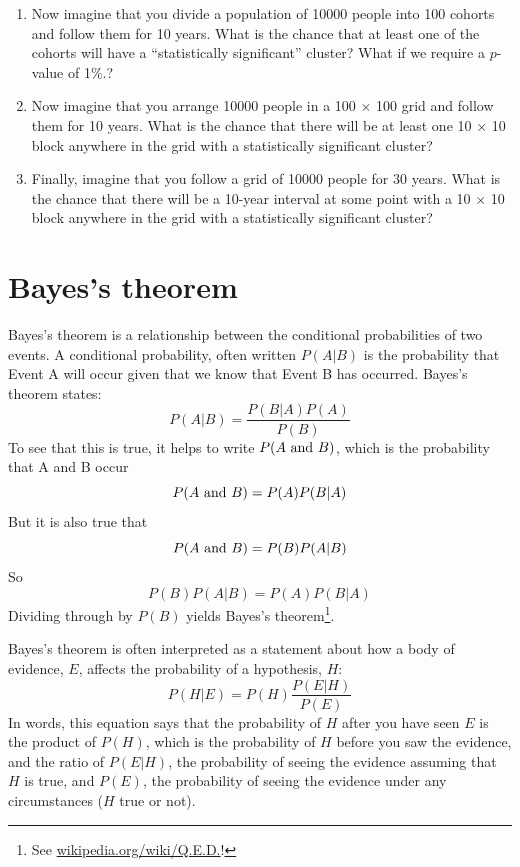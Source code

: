\documentclass[12pt]{book}
\begin{document}
\begin{exercise}
\begin{enumerate}
\item Now imagine that you divide a population of 10000 people into 100
  cohorts and follow them for 10 years.  What is the chance that at
  least one of the cohorts will have a ``statistically significant''
  cluster?  What if we require a $p$-value of 1\%.?

\item Now imagine that you arrange 10000 people in a 100 $\times$ 100
  grid and follow them for 10 years.  What is the chance that there
  will be at least one 10 $\times$ 10 block anywhere in the grid
  with a statistically significant cluster?

\item Finally, imagine that you follow a grid of 10000 people for 30
  years.  What is the chance that there will be a 10-year interval
  at some point with a 10 $\times$ 10 block anywhere in the grid
  with a statistically significant cluster?

\end{enumerate}

\end{exercise}



\section{Bayes's theorem}

Bayes's theorem is a relationship between the conditional probabilities
of two events.  A conditional probability, often written $P(A|B)$ is
the probability that Event A will occur given that we know that
Event B has occurred.  Bayes's theorem states:
%
\[ P(A|B) = \frac{P(B|A)P(A)}{P(B)} \]
%
To see that this is true, it helps to write $P(A ~\mbox{and}~ B)$, which
is the probability that A and B occur
%
\[ P(A ~\mbox{and}~ B) = P(A) P(B|A) \]
%
But it is also true that 
%
\[ P(A ~\mbox{and}~ B) = P(B) P(A|B) \]
%
So
%
\[ P(B) P(A|B) = P(A) P(B|A) \]
%
Dividing through by $P(B)$ yields Bayes's theorem\footnote{See
\url{wikipedia.org/wiki/Q.E.D.}!}.


Bayes's theorem is often interpreted as a statement about 
how a body of evidence, $E$, affects the probability of a 
hypothesis, $H$:
%
\[ P(H|E) = P(H) \frac{P(E|H)}{P(E)} \]
%
In words, this equation says that the probability of $H$ after you
have seen $E$ is the product of $P(H)$, which is the probability of
$H$ before you saw the evidence, and the ratio of $P(E|H)$, the
probability of seeing the evidence assuming that $H$ is true, and
$P(E)$, the probability of seeing the evidence under any circumstances
($H$ true or not).
\end{document}
